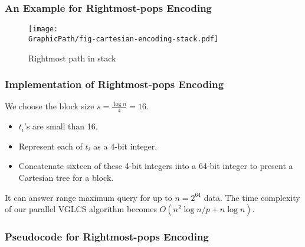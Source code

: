 \begin{frame}
	\frametitle{An Example for Rightmost-pops Encoding}
	\begin{figure}[!thb]
	  \centering
	  \texttt{[image: \\GraphicPath/fig-cartesian-encoding-stack.pdf]}
	  \caption{Rightmost path in stack}
	  \label{fig:interval-cartesian}
	\end{figure}
\end{frame}

\begin{frame}
	\frametitle{Implementation of Rightmost-pops Encoding}
	We choose the block size $s = {{\frac{\log n}{4}}} = 16$.

	\begin{itemize}	
		\setlength\itemsep{1em}
		\item
			$t_i$'s are small than 16.
		\item
			Represent each of $t_i$ as a 4-bit integer.
		\item
			Concatenate sixteen of these 4-bit integers into a 64-bit
			integer to present a Cartesian tree for a block.
	\end{itemize}
	\vspace{1em}
	It can answer range maximum query for up to $n = 2^{64}$ data.  The
	time complexity of our parallel VGLCS algorithm becomes $O(n^2
	\log{n} / p + n \log n)$.
\end{frame}

\begin{frame}
	\frametitle{Pseudocode for Rightmost-pops Encoding}
	\begin{center}
		\scalebox{1} { \begin{minipage}{1\textwidth}
			
			\end{minipage}
		}
	\end{center}
\end{frame}
